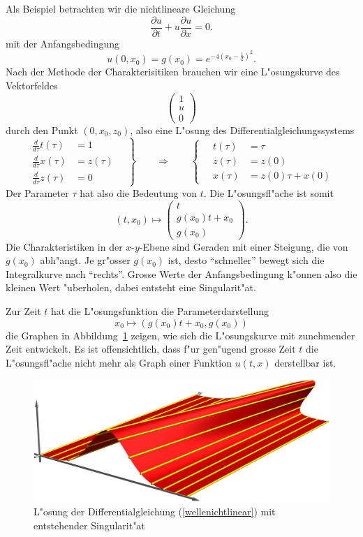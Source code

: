 Als Beispiel betrachten wir die nichtlineare Gleichung 
\begin{equation}
\frac{\partial u}{\partial t}+u\frac{\partial u}{\partial x}=0.
\label{wellenichtlinear}
\end{equation}
mit der Anfangsbedingung 
\[
u(0,x_0)=g(x_0)=e^{-4(x_0-\frac12)^2}.
\]
Nach der Methode der Charakterisitiken brauchen wir eine L"osungskurve
des Vektorfeldes
\[
\begin{pmatrix}
1\\
u\\
0
\end{pmatrix}
\]
durch den Punkt $(0,x_0, z_0)$, also eine L"osung des Differentialgleichungssystems
\[
\left.
\begin{aligned}
\frac{d}{d\tau} t(\tau)&=1\\
\frac{d}{d\tau} x(\tau)&=z(\tau)\\
\frac{d}{d\tau} z(\tau)&=0
\end{aligned}
\quad
\right\}
\qquad
\Rightarrow
\qquad
\left\{
\quad
\begin{aligned}
t(\tau)&=\tau\\
z(\tau)&=z(0)\\
x(\tau)&=z(0)\tau +x(0)
\end{aligned}
\right.
\]
Der Parameter $\tau$ hat also die Bedeutung von $t$.
Die L"osungsfl"ache ist somit
\[
(t,x_0)\mapsto
\begin{pmatrix}
t\\
g(x_0)t+x_0\\
g(x_0)
\end{pmatrix}.
\]
Die Charakteristiken in der $x$-$y$-Ebene sind Geraden mit einer
Steigung, die von $g(x_0)$ abh"angt. Je gr"osser $g(x_0)$ ist, desto
``schneller'' bewegt sich die Integralkurve nach ``rechts''. Grosse
Werte der Anfangsbedingung k"onnen also die kleinen Wert "uberholen,
dabei entsteht eine Singularit"at.

Zur Zeit $t$ hat die L"osungsfunktion die Parameterdarstellung
\[
x_0\mapsto (g(x_0)t+x_0,g(x_0))
\]
die Graphen in Abbildung~\ref{g} zeigen, wie sich die L"osungskurve
mit zunehmender Zeit entwickelt.
Es ist offensichtlich, dass f"ur gen"ugend grosse Zeit $t$ die
L"osungsfl"ache nicht mehr als Graph einer Funktion $u(t,x)$ derstellbar ist.
\begin{figure}
\begin{center}
\includegraphics[width=\hsize]{graphics/welle.jpg}
\end{center}
\caption{L"osung der Differentialgleichung (\ref{wellenichtlinear}) mit
entstehender Singularit"at\label{g}}
\end{figure}

